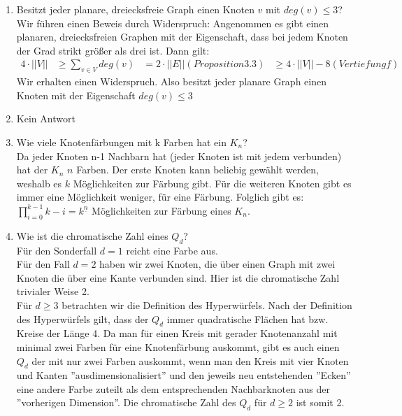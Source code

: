 \begin{enumerate}[label=(\alph*)]
        \item Besitzt jeder planare, dreiecksfreie Graph einen Knoten $v$ mit $deg(v) \leq 3$? \\
        Wir führen einen Beweis durch Widerspruch: Angenommen es gibt einen planaren, dreiecksfreien Graphen mit der Eigenschaft, dass bei jedem Knoten der Grad strikt größer als drei ist. Dann gilt: 
        \begin{align*}
            4 \cdot ||V|| &\geq \sum_{v \in V} deg(v)
            &= 2 \cdot ||E|| (Proposition 3.3)
            &\geq 4 \cdot ||V|| - 8 (Vertiefung f)
        \end{align*}
        Wir erhalten einen Widerspruch. Also besitzt jeder planare Graph einen Knoten mit der Eigenschaft $deg(v) \leq 3$
        \item Kein Antwort

        \item Wie viele Knotenfärbungen mit k Farben hat ein $K_n$? \\
        Da jeder Knoten n-1 Nachbarn hat (jeder Knoten ist mit jedem verbunden) hat der $K_n$ $n$ Farben. 
        Der erste Knoten kann beliebig gewählt werden, weshalb es $k$ Möglichkeiten zur Färbung gibt. 
        Für die weiteren Knoten gibt es immer eine Möglichkeit weniger, für eine Färbung. Folglich gibt es: \\
        $\prod_{i=0}^{k-1} k - i = k^{\underline{n}}$ Möglichkeiten zur Färbung eines $K_n$.
          
        \item Wie ist die chromatische Zahl eines $Q_d$? \\
        Für den Sonderfall $d = 1$ reicht eine Farbe aus. \\
        Für den Fall $d = 2$ haben wir zwei Knoten, die über einen Graph mit zwei Knoten die über eine Kante verbunden sind. Hier ist die chromatische Zahl trivialer Weise 2.\\
        Für $d \geq 3$ betrachten wir die Definition des Hyperwürfels. Nach der Definition des Hyperwürfels gilt, dass der $Q_d$ immer quadratische Flächen hat bzw. Kreise der Länge 4. Da man für einen   Kreis mit gerader Knotenanzahl mit minimal zwei Farben für eine Knotenfärbung auskommt, gibt es auch einen $Q_d$ der mit nur zwei Farben auskommt, wenn man den Kreis mit vier Knoten und Kanten ''ausdimensionalisiert'' und den jeweils neu entstehenden ''Ecken'' eine andere Farbe zuteilt als dem entsprechenden Nachbarknoten aus der ''vorherigen Dimension''. Die chromatische Zahl des $Q_d$ für $d \geq 2$ ist somit 2.
        
    \end{enumerate}

